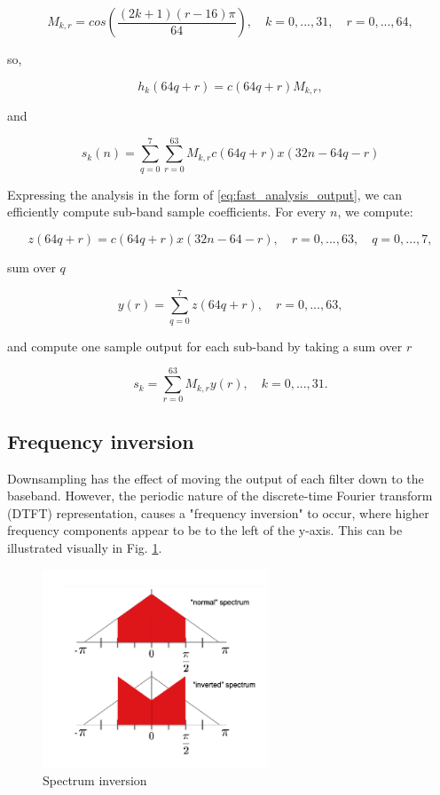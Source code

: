 \documentclass[11pt,a4paper]{article}
\begin{document}
\begin{equation}
\boxed{M_{k,r} = cos\left(\frac{(2k + 1) (r - 16)\pi}{64} \right), \quad k=0,...,31, \quad r=0,...,64,}
\end{equation}

so,

\begin{equation}
h_k(64q+r) = c(64q+r)M_{k,r},
\end{equation}

and

\begin{equation} \label{eq:fast_analysis_output}
s_k(n) = \sum_{q=0}^7 \sum_{r=0}^{63} M_{k,r} c(64q+r)x(32n-64q-r)
\end{equation}

Expressing the analysis in the form of \eqref{eq:fast_analysis_output}, we can efficiently compute sub-band sample coefficients. For every $n$, we compute:

\begin{equation} \label{eq:z}
z(64q+r) = c(64q+r)x(32n-64-r), \quad r = 0,...,63, \quad q = 0,...,7,
\end{equation}

sum over $q$

\begin{equation} \label{eq:y}
y(r) = \sum_{q=0}^7 z(64q+r), \quad r=0,...,63,
\end{equation}

and compute one sample output for each sub-band by taking a sum over $r$

\begin{equation} \label{eq:s}
s_k = \sum_{r=0}^{63} M_{k,r} y(r), \quad	k=0,...,31.
\end{equation}

\subsection{Frequency inversion}
Downsampling has the effect of moving the output of each filter down to the baseband. However, the periodic nature of the discrete-time Fourier transform (DTFT) representation, causes a "frequency inversion" to occur, where higher frequency components appear to be to the left of the y-axis. This can be illustrated visually in Fig. \ref{fig:inversion}.

\begin{figure}[ht]
	\centering
	\includegraphics[width=0.6\textwidth]{analysis/freq_inversion}
	\caption{Spectrum inversion}
	\label{fig:inversion}
\end{figure}
\end{document}
